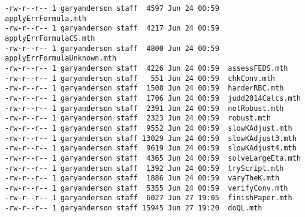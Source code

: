 \documentclass[hyperref,idxtotoc]{labbook}
\begin{document}
\begin{itemize}
\begin{verbatim}
-rw-r--r-- 1 garyanderson staff  4597 Jun 24 00:59  applyErrFormula.mth
-rw-r--r-- 1 garyanderson staff  4217 Jun 24 00:59  applyErrFormulaCS.mth
-rw-r--r-- 1 garyanderson staff  4800 Jun 24 00:59  applyErrFormulaUnknown.mth
-rw-r--r-- 1 garyanderson staff  4226 Jun 24 00:59  assessFEDS.mth
-rw-r--r-- 1 garyanderson staff   551 Jun 24 00:59  chkConv.mth
-rw-r--r-- 1 garyanderson staff  1508 Jun 24 00:59  harderRBC.mth
-rw-r--r-- 1 garyanderson staff  1706 Jun 24 00:59  judd2014Calcs.mth
-rw-r--r-- 1 garyanderson staff  2391 Jun 24 00:59  notRobust.mth
-rw-r--r-- 1 garyanderson staff  2323 Jun 24 00:59  robust.mth
-rw-r--r-- 1 garyanderson staff  9552 Jun 24 00:59  slowKAdjust.mth
-rw-r--r-- 1 garyanderson staff 13029 Jun 24 00:59  slowKAdjust3.mth
-rw-r--r-- 1 garyanderson staff  9619 Jun 24 00:59  slowKAdjust4.mth
-rw-r--r-- 1 garyanderson staff  4365 Jun 24 00:59  solveLargeEta.mth
-rw-r--r-- 1 garyanderson staff  1392 Jun 24 00:59  tryScript.mth
-rw-r--r-- 1 garyanderson staff  1886 Jun 24 00:59  varyTheK.mth
-rw-r--r-- 1 garyanderson staff  5355 Jun 24 00:59  verifyConv.mth
-rw-r--r-- 1 garyanderson staff  6027 Jun 27 19:05  finishPaper.mth
-rw-r--r-- 1 garyanderson staff 15945 Jun 27 19:20  doQL.mth
\end{verbatim}
\end{itemize}
\end{document}
